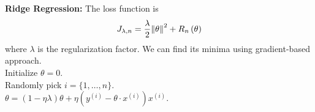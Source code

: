 \documentclass[10pt,landscape,a4paper]{article}
\begin{document}
\begin{multicols*}{3}
\begin{description}
	{\bf Ridge Regression:} The loss function is $$J_{\lambda,n}=\frac{\lambda}{2}\norm{\theta}^2+R_n\left(\theta\right)$$
	where $\lambda$ is the regularization factor. We can find its minima using gradient-based approach.\\
	\vspace{0.25cm}
	\hspace*{0.5cm}{\bf Algorithm} \hspace*{0.5cm}Initialize $\theta=0$.\\
	\hspace*{2.25cm}Randomly pick $i=\{1,\dots,n\}$.\\
	\hspace*{2.25cm}$\theta=\left(1-\eta\lambda\right)\theta+\eta\left(y^{(i)}-\theta\cdot x^{(i)}\right)x^{(i)}$.
\end{description}


\end{multicols*}
\end{document}
